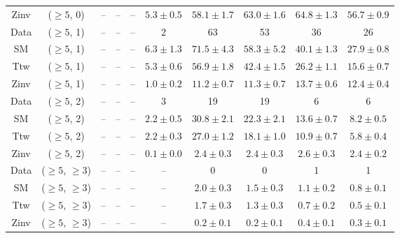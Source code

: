 \begin{table}[h!]
{\begin{tabular}{cccccccccc}
	Zinv & ($\ge5$, 0) & -- & -- & -- & $5.3\pm 0.5$ & $58.1\pm 1.7$ & $63.0\pm 1.6$ & $64.8\pm 1.3$ & $56.7\pm 0.9$ \\[0.5ex] 
	Data & ($\ge5$, 1) & -- & -- & -- & 2 & 63 & 53 & 36 & 26 \\[0.5ex] 
	SM & ($\ge5$, 1) & -- & -- & -- & $6.3\pm 1.3$ & $71.5\pm 4.3$ & $58.3\pm 5.2$ & $40.1\pm 1.3$ & $27.9\pm 0.8$ \\[0.5ex] 
	Ttw & ($\ge5$, 1) & -- & -- & -- & $5.3\pm 0.6$ & $56.9\pm 1.8$ & $42.4\pm 1.5$ & $26.2\pm 1.1$ & $15.6\pm 0.7$ \\[0.5ex] 
	Zinv & ($\ge5$, 1) & -- & -- & -- & $1.0\pm 0.2$ & $11.2\pm 0.7$ & $11.3\pm 0.7$ & $13.7\pm 0.6$ & $12.4\pm 0.4$ \\[0.5ex] 
	Data & ($\ge5$, 2) & -- & -- & -- & 3 & 19 & 19 & 6 & 6 \\[0.5ex] 
	SM & ($\ge5$, 2) & -- & -- & -- & $2.2\pm 0.5$ & $30.8\pm 2.1$ & $22.3\pm 2.1$ & $13.6\pm 0.7$ & $8.2\pm 0.5$ \\[0.5ex] 
	Ttw & ($\ge5$, 2) & -- & -- & -- & $2.2\pm 0.3$ & $27.0\pm 1.2$ & $18.1\pm 1.0$ & $10.9\pm 0.7$ & $5.8\pm 0.4$ \\[0.5ex] 
	Zinv & ($\ge5$, 2) & -- & -- & -- & $0.1\pm 0.0$ & $2.4\pm 0.3$ & $2.4\pm 0.3$ & $2.6\pm 0.3$ & $2.4\pm 0.2$ \\[0.5ex] 
	Data & ($\ge5$, $\ge3$) & -- & -- & -- & -- & 0 & 0 & 1 & 1 \\[0.5ex] 
	SM & ($\ge5$, $\ge3$) & -- & -- & -- & -- & $2.0\pm 0.3$ & $1.5\pm 0.3$ & $1.1\pm 0.2$ & $0.8\pm 0.1$ \\[0.5ex] 
	Ttw & ($\ge5$, $\ge3$) & -- & -- & -- & -- & $1.7\pm 0.3$ & $1.3\pm 0.3$ & $0.7\pm 0.2$ & $0.5\pm 0.1$ \\[0.5ex] 
	Zinv & ($\ge5$, $\ge3$) & -- & -- & -- & -- & $0.2\pm 0.1$ & $0.2\pm 0.1$ & $0.4\pm 0.1$ & $0.3\pm 0.1$ \\[0.5ex] 
	\hline
	\hline
\end{tabular}}
\end{table}

